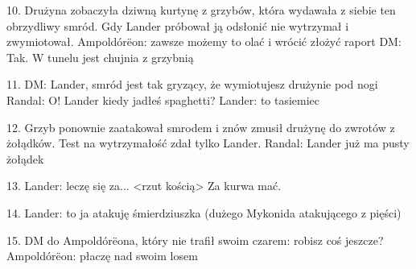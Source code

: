 \documentclass[10pt,twoside,twocolumn]{book}
\begin{document}
10. Drużyna zobaczyła dziwną kurtynę z grzybów, która wydawała z siebie ten obrzydliwy smród. Gdy Lander próbował ją odsłonić nie wytrzymał i zwymiotował.
Ampoldórëon: zawsze możemy to olać i wrócić złożyć raport
DM: Tak. W tunelu jest chujnia z grzybnią

11. DM: Lander, smród jest tak gryzący, że wymiotujesz drużynie pod nogi
Randal: O! Lander kiedy jadłeś spaghetti?
Lander: to tasiemiec

12. Grzyb ponownie zaatakował smrodem i znów zmusił drużynę do zwrotów z żołądków. Test na wytrzymałość zdał tylko Lander.
Randal: Lander już ma pusty żołądek

13. Lander: leczę się za... <rzut kością> Za kurwa mać.

14. Lander: to ja atakuję śmierdziuszka (dużego Mykonida atakującego z pięści)

15. DM do Ampoldórëona, który nie trafił swoim czarem: robisz coś jeszcze?
Ampoldórëon: płaczę nad swoim losem
\end{document}
